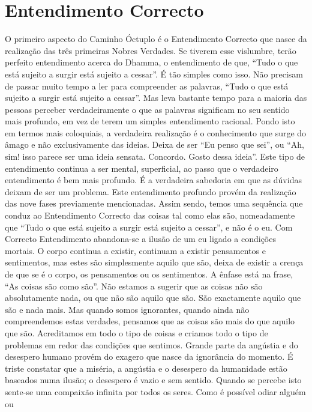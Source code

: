 \section{Entendimento Correcto}

O primeiro aspecto do Caminho Óctuplo é o Entendimento Correcto que nasce da realização das três primeiras
Nobres Verdades. Se tiverem esse vislumbre, terão perfeito
entendimento acerca do Dhamma, o entendimento de que,
“Tudo o que está sujeito a surgir está sujeito a cessar”. É tão
simples como isso. Não precisam de passar muito tempo a
ler para compreender as palavras, “Tudo o que está sujeito a
surgir está sujeito a cessar”. Mas leva bastante tempo para a
maioria das pessoas perceber verdadeiramente o que as
palavras significam no seu sentido mais profundo, em vez
de terem um simples entendimento racional.
Pondo isto em termos mais coloquiais, a verdadeira
realização é o conhecimento que surge do âmago e não
exclusivamente das ideias. Deixa de ser “Eu penso que sei”,
ou “Ah, sim! isso parece ser uma ideia sensata. Concordo.
Gosto dessa ideia”. Este tipo de entendimento continua a ser
mental, superficial, ao passo que o verdadeiro entendimento é
bem mais profundo. É a verdadeira sabedoria em que as
dúvidas deixam de ser um problema.
Este entendimento profundo provém da realização das
nove fases previamente mencionadas. Assim sendo, temos
uma sequência que conduz ao Entendimento Correcto das
coisas tal como elas são, nomeadamente que “Tudo o que está
sujeito a surgir está sujeito a cessar”, e não é o eu. Com
Correcto Entendimento abandona-se a ilusão de um eu ligado
a condições mortais. O corpo continua a existir, continuam a
existir pensamentos e sentimentos, mas estes são simplesmente aquilo que são, deixa de existir a crença de que se é o
corpo, os pensamentos ou os sentimentos. A ênfase está na
frase, “As coisas são como são”. Não estamos a sugerir que
as coisas não são absolutamente nada, ou que não são aquilo
que são. São exactamente aquilo que são e nada mais. Mas
quando somos ignorantes, quando ainda não compreendemos
estas verdades, pensamos que as coisas são mais do que aquilo
que são. Acreditamos em todo o tipo de coisas e criamos todo
o tipo de problemas em redor das condições que sentimos.
Grande parte da angústia e do desespero humano provém
do exagero que nasce da ignorância do momento. É triste
constatar que a miséria, a angústia e o desespero da humanidade estão baseados numa ilusão; o desespero é vazio e sem
sentido. Quando se percebe isto sente-se uma compaixão
infinita por todos os seres. Como é possível odiar alguém ou

